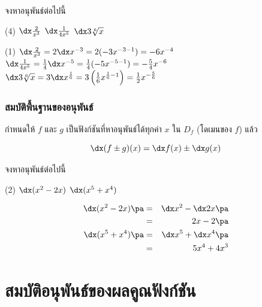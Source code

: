 \begin{frame}[t]
\begin{ex}
จงหาอนุพันธ์ต่อไปนี้
\begin{tasks}(4) 
\task $\dx \frac{2}{x^3}$
\task $\dx \frac{1}{4x^5}$
\task $\dx 3 \sqrt[6]{x}$
\end{tasks}
\end{ex}
\begin{sol}
\begin{tasks}(1) 
\task $\dx \frac{2}{x^3} = 2 \dx x^{-3} = 2 (-3x^{-3-1}) = -6x^{-4}$
\task $\dx \frac{1}{4x^5} = \frac{1}{4} \dx x^{-5} = \frac{1}{4} (-5x^{-5-1}) = -\frac{5}{4} x^{-6}$
\task $\dx 3 \sqrt[6]{x} = 3 \dx x^{\frac{1}{6}} = 3 \left( \frac{1}{6} x^{\frac{1}{6} - 1} \right) = \frac{1}{2} x^{-\frac{5}{6}}$
\end{tasks}
\end{sol}
\end{frame}

\begin{frame}
\frametitle{สมบัติพื้นฐานของอนุพันธ์}
\begin{prop}{}{}
กำหนดให้ $f$ และ $g$ เป็นฟังก์ชันที่หาอนุพันธ์ได้ทุกค่า $x$ ใน $D_f$ (โดเมนของ $f$) แล้ว \pa

\begin{equation}
\dx (f \pm g)(x) = \dx f(x) \pm \dx g(x)
\end{equation}

\end{prop}
\end{frame}


\begin{frame}[t]
\begin{ex}
จงหาอนุพันธ์ต่อไปนี้
\begin{tasks}(2)
\task $\dx (x^2 -2x)$ 
\task $ \dx (x^5+x^4)$
\end{tasks}
\end{ex}
\begin{sol}
\begin{eqnarray*}
\dx (x^2 - 2x) \pa &=& \dx x^2 - \dx 2x \pa \\
&=& 2x - 2 \pa \\
\dx (x^5 + x^4) \pa &=& \dx x^5 + \dx x^4 \pa \\
&=& 5x^4 + 4x^3
\end{eqnarray*}
\end{sol}
\end{frame}

\section[คูณ]{สมบัติอนุพันธ์ของผลคูณฟังก์ชัน}
\frame{\sectionpage}

